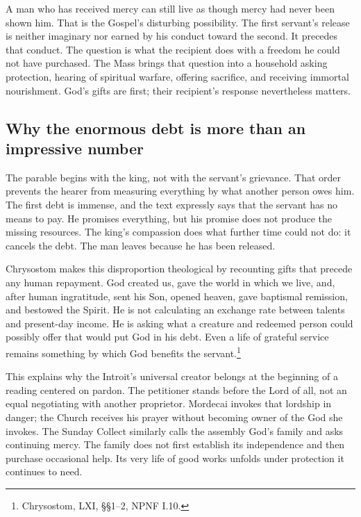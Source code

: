 
A man who has received mercy can still live as though mercy had never
been shown him. That is the Gospel's disturbing possibility. The first
servant's release is neither imaginary nor earned by his conduct toward
the second. It precedes that conduct. The question is what the recipient
does with a freedom he could not have purchased. The Mass brings that
question into a household asking protection, hearing of spiritual warfare,
offering sacrifice, and receiving immortal nourishment. God's gifts are
first; their recipient's response nevertheless matters.

\subsection{Why the enormous debt is more than an impressive number}
The parable begins with the king, not with the servant's grievance.
That order prevents the hearer from measuring everything by what another
person owes him. The first debt is immense, and the text expressly says
that the servant has no means to pay. He promises everything, but his
promise does not produce the missing resources. The king's compassion
does what further time could not do: it cancels the debt. The man leaves
because he has been released.

Chrysostom makes this disproportion theological by recounting gifts that
precede any human repayment. God created us, gave the world in which we
live, and, after human ingratitude, sent his Son, opened heaven, gave
baptismal remission, and bestowed the Spirit. He is not calculating an
exchange rate between talents and present-day income. He is asking what
a creature and redeemed person could possibly offer that would put God
in his debt. Even a life of grateful service remains something by which
God benefits the servant.\footnote{Chrysostom,  LXI,
\S\S1--2, NPNF I.10.}

This explains why the Introit's universal creator belongs at the
beginning of a reading centered on pardon. The petitioner stands before
the Lord of all, not an equal negotiating with another proprietor.
Mordecai invokes that lordship in danger; the Church receives his prayer
without becoming owner of the God she invokes. The Sunday Collect
similarly calls the assembly God's family and asks continuing mercy.
The family does not first establish its independence and then purchase
occasional help. Its very life of good works unfolds under protection
it continues to need.

